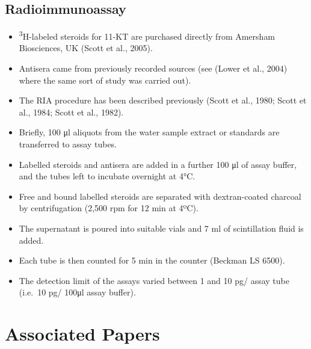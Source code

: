 \documentclass[
  letterpaper,
  DIV=11,
  numbers=noendperiod]{scrreprt}
\providecommand{\tightlist}{%
  \setlength{\itemsep}{0pt}\setlength{\parskip}{0pt}}\usepackage{longtable,booktabs,array}
\begin{document}
\hypertarget{radioimmunoassay}{%
\subsection{Radioimmunoassay}\label{radioimmunoassay}}

\begin{itemize}
\tightlist
\item
  \textsuperscript{3}H-labeled steroids for 11-KT are purchased directly
  from Amersham Biosciences, UK (Scott et al., 2005).
\item
  Antisera came from previously recorded sources (see (Lower et al.,
  2004) where the same sort of study was carried out).
\item
  The RIA procedure has been described previously (Scott et al., 1980;
  Scott et al., 1984; Scott et al., 1982).
\item
  Briefly, 100 μl aliquots from the water sample extract or standards
  are transferred to assay tubes.
\item
  Labelled steroids and antisera are added in a further 100 μl of assay
  buffer, and the tubes left to incubate overnight at 4°C.
\item
  Free and bound labelled steroids are separated with dextran-coated
  charcoal by centrifugation (2,500 rpm for 12 min at 4ºC).
\item
  The supernatant is poured into suitable vials and 7 ml of
  scintillation fluid is added.
\item
  Each tube is then counted for 5 min in the counter (Beckman LS 6500).
\item
  The detection limit of the assays varied between 1 and 10 pg/ assay
  tube (i.e.~10 pg/ 100μl assay buffer).
\end{itemize}

\hypertarget{associated-papers-53}{%
\section{Associated Papers}\label{associated-papers-53}}
\end{document}
